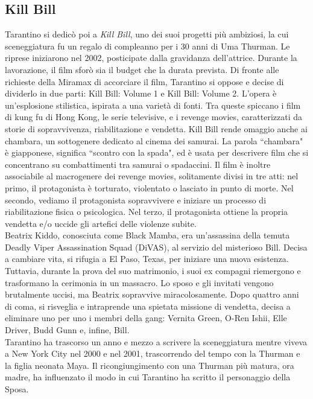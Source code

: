 \documentclass[12pt]{article} %
\begin{document}
\subsection{Kill Bill}
\begin{flushleft}
    Tarantino si dedicò poi a \textit{Kill Bill}, uno dei suoi progetti più ambiziosi, la cui sceneggiatura fu un regalo di compleanno per i 30 anni di Uma Thurman. Le riprese iniziarono nel 2002, posticipate dalla gravidanza dell’attrice. Durante la lavorazione, il film sforò sia il budget che la durata prevista. Di fronte alle richieste della Miramax di accorciare il film, Tarantino si oppose e decise di dividerlo in due parti: Kill Bill: Volume 1 e Kill Bill: Volume 2.  
    L’opera è un’esplosione stilistica, ispirata a una varietà di fonti. Tra queste spiccano i film di kung fu di Hong Kong, le serie televisive, e i revenge movies, caratterizzati da storie di sopravvivenza, riabilitazione e vendetta. Kill Bill rende omaggio anche ai chambara, un sottogenere dedicato al cinema dei samurai.  La parola ``chambara" è giapponese, significa ``scontro con la spada", ed è usata per descrivere film che si concentrano su combattimenti tra samurai o spadaccini. 
    Il film è inoltre associabile al macrogenere dei revenge movies, solitamente divisi in tre atti: nel primo, il protagonista è torturato, violentato o lasciato in punto di morte. Nel secondo, vediamo il protagonista sopravvivere e iniziare un processo di riabilitazione fisica o psicologica. Nel terzo, il protagonista ottiene la propria vendetta e/o uccide gli artefici delle violenze subite.
    \\\vspace{1cm}
    Beatrix Kiddo, conosciuta come Black Mamba, era un’assassina della temuta Deadly Viper Assassination Squad (DiVAS), al servizio del misterioso Bill. Decisa a cambiare vita, si rifugia a El Paso, Texas, per iniziare una nuova esistenza.  
    Tuttavia, durante la prova del suo matrimonio, i suoi ex compagni riemergono e trasformano la cerimonia in un massacro. Lo sposo e gli invitati vengono brutalmente uccisi, ma Beatrix sopravvive miracolosamente. Dopo quattro anni di coma, si risveglia e intraprende una spietata missione di vendetta, decisa a eliminare uno per uno i membri della gang: Vernita Green, O-Ren Ishii, Elle Driver, Budd Gunn e, infine, Bill.
    \\\vspace{1cm}
    Tarantino ha trascorso un anno e mezzo a scrivere la sceneggiatura mentre viveva a New York City nel 2000 e nel 2001, trascorrendo del tempo con la Thurman e la figlia neonata Maya. Il ricongiungimento con una Thurman più matura, ora madre, ha influenzato il modo in cui Tarantino ha scritto il personaggio della Sposa. 

\end{flushleft}
\end{document}
